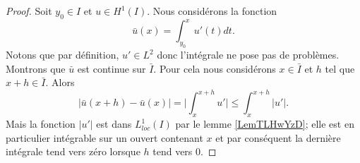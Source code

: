 \begin{proof}
    Soit \( y_0\in I\) et \( u\in H^1(I)\). Nous considérons la fonction
    \begin{equation}
        \bar u(x)=\int_{y_0}^xu'(t)dt.
    \end{equation}
    Notons que par définition, \( u'\in L^2\) donc l'intégrale ne pose pas de problèmes. Montrons que \( \bar u\) est continue sur \( \bar I\). Pour cela nous considérons \( x\in\bar I\) et \( h\) tel que \( x+h\in \bar I\). Alors
    \begin{equation}
        \big| \bar u(x+h)-\bar u(x) \big|=\big| \int_x^{x+h}u' \big|\leq \int_x^{x+h}| u' |.
    \end{equation}
    Mais la fonction \( | u' |\) est dans \( L^1_{loc}(I)\) par le lemme \ref{LemTLHwYzD}; elle est en particulier intégrable sur un ouvert contenant \( x\) et par conséquent la dernière intégrale tend vers zéro lorsque \( h\) tend vers \( 0\).


\end{proof}
